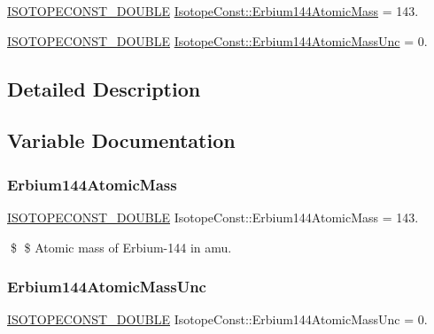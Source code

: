 \begin{DoxyCompactItemize}
\item 
\mbox{\hyperlink{group___isotope_const-_macros_ga8f45a7272ce02c0b4c65c44636ed719a}{I\+S\+O\+T\+O\+P\+E\+C\+O\+N\+S\+T\+\_\+\+D\+O\+U\+B\+LE}} \mbox{\hyperlink{group___isotope_const-_erbium-_er144_ga12ea6e8239d39dc28d09fc617329e55e}{Isotope\+Const\+::\+Erbium144\+Atomic\+Mass}} = 143.
\item 
\mbox{\hyperlink{group___isotope_const-_macros_ga8f45a7272ce02c0b4c65c44636ed719a}{I\+S\+O\+T\+O\+P\+E\+C\+O\+N\+S\+T\+\_\+\+D\+O\+U\+B\+LE}} \mbox{\hyperlink{group___isotope_const-_erbium-_er144_ga23f024ed0a0181f6f44019891381558d}{Isotope\+Const\+::\+Erbium144\+Atomic\+Mass\+Unc}} = 0.
\end{DoxyCompactItemize}


\subsection{Detailed Description}


\subsection{Variable Documentation}
\mbox{\label{group___isotope_const-_erbium-_er144_ga12ea6e8239d39dc28d09fc617329e55e}} 
\subsubsection{\texorpdfstring{Erbium144\+Atomic\+Mass}{Erbium144AtomicMass}}
{\footnotesize\ttfamily \mbox{\hyperlink{group___isotope_const-_macros_ga8f45a7272ce02c0b4c65c44636ed719a}{I\+S\+O\+T\+O\+P\+E\+C\+O\+N\+S\+T\+\_\+\+D\+O\+U\+B\+LE}} Isotope\+Const\+::\+Erbium144\+Atomic\+Mass = 143.}

\$ \$ Atomic mass of Erbium-\/144 in amu. \mbox{\label{group___isotope_const-_erbium-_er144_ga23f024ed0a0181f6f44019891381558d}} 
\subsubsection{\texorpdfstring{Erbium144\+Atomic\+Mass\+Unc}{Erbium144AtomicMassUnc}}
{\footnotesize\ttfamily \mbox{\hyperlink{group___isotope_const-_macros_ga8f45a7272ce02c0b4c65c44636ed719a}{I\+S\+O\+T\+O\+P\+E\+C\+O\+N\+S\+T\+\_\+\+D\+O\+U\+B\+LE}} Isotope\+Const\+::\+Erbium144\+Atomic\+Mass\+Unc = 0.}

